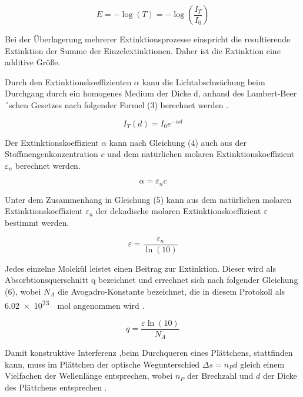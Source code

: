 \documentclass[11pt,ngerman]{scrartcl}
\begin{document}
\begin{equation}
	E = -\log(T) = -\log\left(\frac{I_T}{I_0}\right)
	\label{eq:extinktion}
\end{equation}

\noindent Bei der Überlagerung mehrerer Extinktionsprozesse einspricht die
resultierende Extinktion der Summe der Einzelextinktionen. Daher ist die
Extinktion eine additive Größe.

\noindent Durch den Extinktionskoeffizienten $\alpha$ kann die
Lichtabschwächung beim Durchgang durch ein homogenes Medium der Dicke d, anhand
des Lambert-Beer´schen Gesetzes nach folgender Formel (3) berechnet werden \cite{spektovorlage}.

\begin{equation}
	I_T(d) = I_0 e^{-\alpha d}
\end{equation}

\noindent Der Extinktionskoeffizient $\alpha$ kann nach Gleichung (4) auch aus
der Stoffmengenkonzentration $c$  und dem natürlichen molaren
Extinktionskoeffizient $\varepsilon_n$ berechnet werden.

\begin{equation}
	\alpha = \varepsilon_n c
\end{equation}

\noindent Unter dem Zusammenhang in Gleichung (5) kann aus dem natürlichen
molaren Extinktionskoeffizient $\varepsilon_n$ der dekadische molaren
Extinktionskoeffizient $\varepsilon$ bestimmt werden.

\begin{equation}
	\varepsilon = \frac{\varepsilon_n}{\ln(10)}
\end{equation}

\noindent Jedes einzelne Molekül leistet einen Beitrag zur Extinktion. Dieser
wird als Absorbtionsquerschnitt q bezeichnet und errechnet sich nach folgender
Gleichung (6), wobei $N_A$ die Avogadro-Konstante bezeichnet, die in diesem
Protokoll als \SI{6.02 e23}{\per\mol} angenommen wird \cite{spektovorlage}.

\begin{equation}
	q = \frac{\varepsilon \ln(10)}{N_A}
\end{equation}

\noindent Damit konstruktive Interferenz ,beim Durchqueren eines Plättchens,
stattfinden kann, muss im Plättchen der optische Wegunterschied $\Delta s = n_P
	d$ gleich einem Vielfachen der Wellenlänge entsprechen, wobei $n_P$ der
Brechzahl und $d$ der Dicke des Plättchens entsprechen \cite{spektovorlage}.
\end{document}
